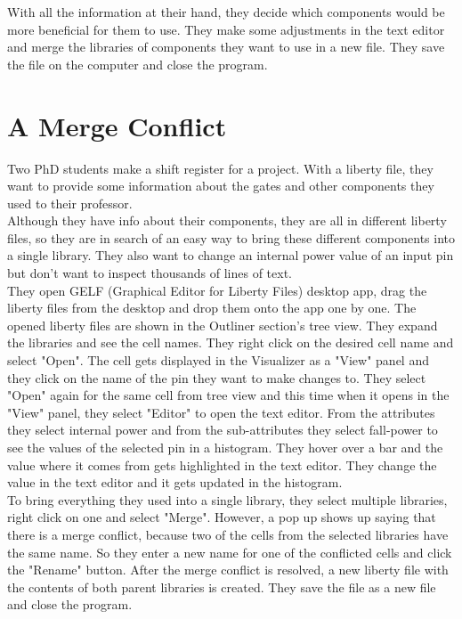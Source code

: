 \documentclass[10pt,a4paper]{report}
\begin{document}
With all the information at their hand, they decide which components would be more beneficial for them to use. They make some adjustments in the text editor and merge the libraries of components they want to use in a new file. They save the file on the computer and close the program.
\newpage
\section{A Merge Conflict}

Two PhD students make a shift register for a project. With a liberty file, they want to provide some information about the gates and other components they used to their professor. 
\\

Although they have info about their components, they are all in different liberty files, so they are in search of an easy way to bring these different components into a single library. They also want to change an internal power value of an input pin but don't want to inspect thousands of lines of text.
\\

They open GELF (Graphical Editor for Liberty Files) desktop app, drag the liberty files from the desktop and drop them onto the app one by one. The opened liberty files are shown in the Outliner section's tree view. They expand the libraries and see the cell names. They right click on the desired cell name and select "Open". The cell gets displayed in the Visualizer as a "View" panel and they click on the name of the pin they want to make changes to. They select "Open" again for the same cell from tree view and this time when it opens in the "View" panel, they select "Editor" 
to open the text editor. From the attributes they select internal power and from the sub-attributes they select fall-power to see the values of the selected pin in a histogram. They hover over a bar and the value where it comes from gets highlighted in the text editor. They change the value in the text editor and it gets updated in the histogram. 
\\

To bring everything they used into a single library, they select multiple libraries, right click on one and select "Merge". However, a pop up shows up saying that there is a merge conflict, because two of the cells from the selected libraries have the same name. So they enter a new name for one of the conflicted cells and click the "Rename" button. After the merge conflict is resolved, a new liberty file with the contents of both parent libraries is created. They save the file as a new file and close the program.
\end{document}

